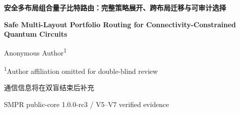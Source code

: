 \documentclass[11pt,a4paper]{article}
\newcommand{\headingfonts}{%
  \cnsans
  \setTransitionsForLatin{\latinsans}{\cnsans}%
  \cnsans
}
\begin{document}
\begin{center}
  {\headingfonts\fontsize{20}{28}\selectfont\bfseries
  安全多布局组合量子比特路由：完整策略展开、跨布局迁移与可审计选择\par}
  \vspace{0.55em}
  {\latinsans\large\bfseries
  Safe Multi-Layout Portfolio Routing for Connectivity-Constrained\\
  Quantum Circuits\par}
  \vspace{1.0em}
  {\large Anonymous Author\textsuperscript{1}\par}
  \vspace{0.25em}
  {\small \textsuperscript{1}Author affiliation omitted for double-blind review\par}
  \vspace{0.25em}
  {\small 通信信息将在双盲结束后补充\par}
  \vspace{0.25em}
  {\small SMPR public-core 1.0.0-rc3 / V5--V7 verified evidence\par}
\end{center}

\vspace{0.4em}
\begin{abstract}
\begin{spacing}{1.38}
受限耦合拓扑要求量子编译器通过动态逻辑--物理映射插入 SWAP，但强基线的随机布局、多步路由决策与工程开销之间存在明显张力。本文提出安全多布局组合路由器（Safe Multi-Layout Portfolio Router，SMPR）：以 20 个随机种子的 LightSABRE 为显式质量下界，使用完整基线策略展开生成互补路由候选，并将 LightSABRE 并列最优初始布局及其代理筛选的一换位邻域重新路由；最终按 $(\text{SWAP},\text{加权深度})$ 字典序选择，完全同质时优先 LightSABRE。由于候选集中始终包含 LightSABRE，SMPR 在指标实现一致的前提下具有结构性的逐实例不退化保证。为避免候选组合被解释器和 Qiskit 重复导入开销淹没，本文进一步设计四个长生命周期分片进程和最长处理时间优先调度。

算法冻结后，我们在 120 个预注册 V6 盲测实例上进行主要推断。SMPR 将总 SWAP 从 3176 降至 3051，减少 125 个（3.94\%）；逐实例胜/平/负为 50/70/0。以每例 CX 数归一化的配对差值均值为 $-0.018727$，10\,000 次实例级 bootstrap 的 95\% 置信区间为 $[-0.024346,-0.013634]$，上端低于零；按 60 个因子单元分组重采样的补充稳健区间为 $[-0.024392,-0.013594]$。语义、拓扑和指标审计均为 120/120。2026-07-25 的独立环境复现再次得到 V5/V6 总量和联合统计审计。随后执行的 V7 前瞻性外部验证使用 10 条 QASMBench 公共线路、11--23 个逻辑比特和 19/57 比特 heavy-hex，在三次同机重复中形成 120 条配对观测。相对时间匹配 LightSABRE，SMPR 在 $0.25T,0.5T,T,2T$ 四档预算下分别减少 11.05\%、8.84\%、7.30\% 和 5.17\% 的总 SWAP；四个按线路聚类的 95\% 区间均轻微跨越零，故该结果是外部汇总优势证据，而非 95\% 水平下的显著性结论。V7 的冻结清单、三个重复哈希、环境记录以及 120/120 路由轨迹、拓扑和安全下界审计全部通过。独立的自适应展开分支在 V6 上弱于 LightSABRE；因此，证据支持安全组合与跨布局迁移，而非某个单一路由器的普遍支配。
\end{spacing}

\noindent\textbf{关键词：}量子比特路由；量子编译；LightSABRE；策略展开；初始布局；算法组合；盲测
\end{abstract}
\end{document}
